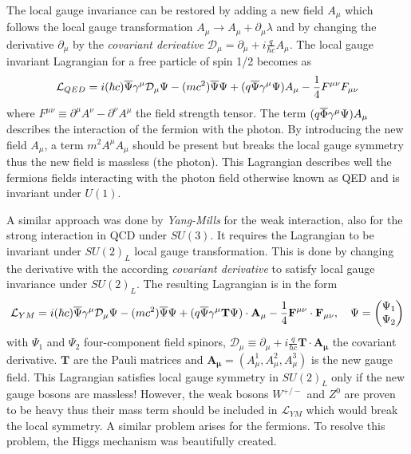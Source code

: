 The local gauge invariance can be restored by adding a new field $A_{\mu}$ which follows the local gauge transformation $A_{\mu} \rightarrow A_{\mu} + \partial_{\mu}\lambda$ and by changing the derivative $\partial_{\mu}$ by the \textit{covariant derivative} $\mathcal{D}_{\mu} = \partial_{\mu} + i\frac{q}{\hbar c}A_{\mu}$. The local gauge invariant Lagrangian for a free particle of spin 1/2 becomes as \cite{Griffiths:343277}
\begin{equation}
  \mathcal{L}_{QED} = i(\hbar c)\overline{\rm \Psi}\gamma^{\mu}\mathcal{D}_{\mu}\Psi - (mc^2)\overline{\rm \Psi}\Psi + (q\overline{\rm \Psi}\gamma^{\mu}\Psi)A_{\mu} - \frac{1}{4}F^{\mu\nu}F_{\mu\nu}
\end{equation}
where $F^{\mu\nu} \equiv \partial^{\mu}A^{\nu} - \partial^{\nu}A^{\mu}$ the field strength tensor. The term $(q\overline{\rm \Phi}\gamma^{\mu}\Psi)A_{\mu}$ describes the interaction of the fermion with the photon. By introducing the new field $A_{\mu}$, a term $m^2A^{\mu}A_{\mu}$ should be present but breaks the local gauge symmetry thus the new field is massless (the photon). This Lagrangian describes well the fermions fields interacting with the photon field otherwise known as QED and is invariant under $U(1)$.

A similar approach was done by \textit{Yang-Mills} for the weak interaction, also for the strong interaction in QCD under $SU(3)$. It requires the Lagrangian to be invariant under $SU(2)_{L}$ local gauge transformation. This is done by changing the derivative with the according \textit{covariant derivative} to satisfy local gauge invariance under $SU(2)_{L}$. The resulting Lagrangian is in the form \cite{Griffiths:343277}
\begin{equation}
  \mathcal{L}_{YM} = i(\hbar c)\overline{\rm \Psi}\gamma^{\mu}\mathcal{D}_{\mu}\Psi - (mc^2)\overline{\rm \Psi}\Psi + (q\overline{\rm \Psi}\gamma^{\mu}\mathbf{T}\Psi) \cdot \mathbf{A_{\mu}} - \frac{1}{4}\mathbf{F^{\mu\nu}} \cdot \mathbf{F_{\mu\nu}}, \quad \Psi = \begin{pmatrix} \Psi_1 \\ \Psi_2 \end{pmatrix}
\end{equation}
with $\Psi_1$ and $\Psi_2$ four-component field spinors, $\mathcal{D}_{\mu} \equiv \partial_{\mu} + i\frac{q}{\hbar c}\mathbf{T} \cdot \mathbf{A_{\mu}}$ the covariant derivative. $\mathbf{T}$ are the Pauli matrices and $\mathbf{A_{\mu}} = (A_{\mu}^1, A_{\mu}^2, A_{\mu}^3)$ is the new gauge field. This Lagrangian satisfies local gauge symmetry in $SU(2)_{L}$ only if the new gauge bosons are massless! However, the weak bosons $W^{+/-}$ and $Z^0$ are proven to be heavy thus their mass term should be included in $\mathcal{L}_{YM}$ which would break the local symmetry. A similar problem arises for the fermions. To resolve this problem, the Higgs mechanism was beautifully created.

